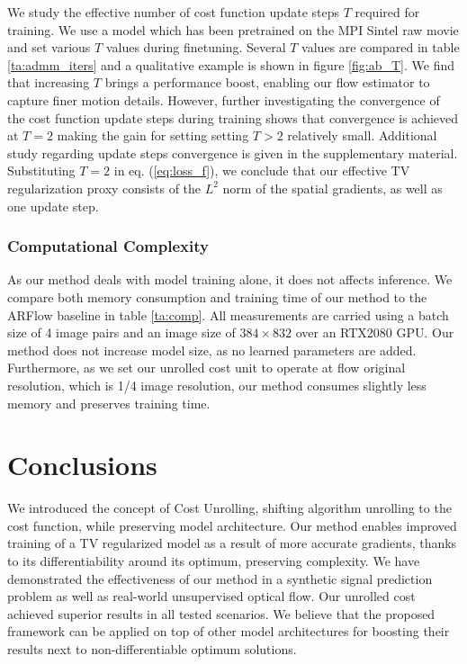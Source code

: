 \documentclass[10pt,twocolumn,letterpaper]{article}
\begin{document}
We study the effective number of cost function update steps $T$ required for training. We use a model which has been pretrained on the MPI Sintel raw movie and set various $T$ values during finetuning. Several $T$ values are compared in table \ref{ta:admm_iters} and a qualitative example is shown in figure \ref{fig:ab_T}. We find  that increasing $T$ brings a performance boost, enabling our flow estimator to capture finer motion details. 
However, further investigating the convergence of the cost function update steps during training shows that convergence is achieved at $T=2$ making the gain for setting setting $T>2$ relatively small. Additional study regarding update steps convergence is given in the supplementary material.
Substituting $T=2$ in eq. (\ref{eq:loss_f}), we conclude that our effective TV regularization proxy consists of the $L^2$ norm of the spatial gradients, as well as one update step.


\subsubsection{Computational Complexity}
As our method deals with model training alone, it does not affects inference. We compare both memory consumption and training time of our method to the ARFlow \cite{liu2020learning} baseline in table \ref{ta:comp}. All measurements are carried using a batch size of 4 image pairs and an image size of $384\times832$ over an RTX2080 GPU. Our method does not increase model size, as no learned parameters are added. Furthermore, as we set our unrolled cost unit to operate at flow original resolution, which is 1/4 image resolution, our method consumes slightly less memory and preserves training time. 
 \section{Conclusions}
We introduced the concept of Cost Unrolling, shifting algorithm unrolling to the cost function, while preserving model architecture. Our method enables improved training of a TV regularized model as a result of more accurate gradients, thanks to its differentiability around its optimum, preserving complexity.
We have demonstrated the effectiveness of our method in a synthetic signal prediction problem as well as real-world unsupervised optical flow. Our unrolled cost achieved superior results in all tested scenarios.
We believe that the proposed framework can be applied on top of other model architectures for boosting their results next to non-differentiable optimum solutions.

 {\small


}
\end{document}
